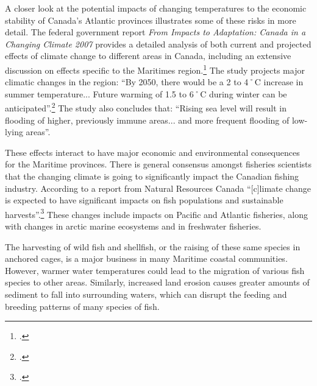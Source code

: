 \documentclass[10pt]{article}
\begin{document}
A closer look at the potential impacts of changing temperatures to the economic stability of Canada's Atlantic provinces illustrates some of these risks in more detail. 
The federal government report \emph{From Impacts to Adaptation: Canada in a Changing Climate 2007} provides a detailed analysis of both current and projected effects of climate change to different areas in Canada, including an extensive discussion on effects specific to the Maritimes region.\footcite[][]{ImpToAda}
The study projects major climatic changes in the region: ``By 2050, there would be a 2 to 4˚C increase in summer temperature... Future warming of 1.5 to 6˚C during winter can be anticipated''.\footcite[][p.131]{ImpToAda}
The study also concludes that: ``Rising sea level will result in flooding of higher, previously immune areas... and more frequent flooding of low-lying areas''.



These effects interact to have major economic and environmental consequences for the Maritime provinces.  
There is general consensus amongst fisheries scientists that the changing climate is going to significantly impact the Canadian fishing industry.
According to a report from Natural Resources Canada ``[c]limate change is expected to have significant impacts on fish populations and sustainable harvests''.\footcite[][p. xv]{NRCANImpactsAdapt}
These changes include impacts on Pacific and Atlantic fisheries, along with changes in arctic marine ecosystems and in freshwater fisheries.



The harvesting of wild fish and shellfish, or the raising of these same species in anchored cages, is a major business in many Maritime coastal communities.  
However, warmer water temperatures could lead to the migration of various fish species to other areas. 
Similarly, increased land erosion causes greater amounts of sediment to fall into surrounding waters, which can disrupt the feeding and breeding patterns of many species of fish.
\end{document}
